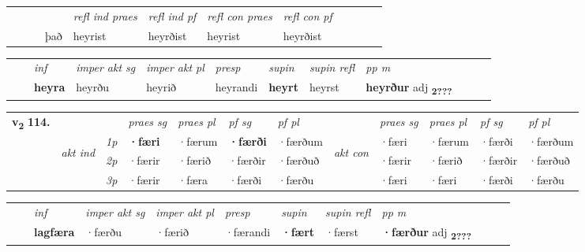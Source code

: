 \begin{tabular}{llllllllllll}
 & &  & &  \textit{refl ind praes} & \textit{refl ind pf} & \textit{refl con praes} & \textit{refl con pf} \\*
 & &  & það & heyrist & heyrðist & heyrist & heyrðist \\*
\cmidrule{5-9}
\end{tabular}


\begin{tabular}{llllllllllll}
 & & \textit{inf} & \textit{imper akt sg} & \textit{imper akt pl}   & \textit{presp} & \textit{supin} & \textit{supin refl} & \textit{pp m}     \\*
  & & \textbf{heyra} & heyrðu  & heyrið   & heyrandi &  \textbf{heyrt} & heyrst & \textbf{heyrður} adj \textbf{\textsubscript{2???}} \\*
\cmidrule{1-12}
\end{tabular}



\begin{tabular}{llllllllllll} \toprule
\multirow{4}{*}{{{\textbf{v{\textsubscript{2}}} \Large{\textbf{114.}}}}}  & &   &  \textit{praes sg}  & \textit{praes pl}  &\textit{ pf sg} & \textit{pf pl} &  &  \textit{praes sg}  & \textit{praes pl}  & \textit{pf sg} & \textit{pf pl } \\*
	\cmidrule{4-7} \cmidrule{9-12}
 & \multirow{3}{*}{\begin{turn}{90}\textit{akt ind}\end{turn}} & {\textit{1p}} & \textbf{·færi} & ·færum    & \textbf{·færði} & ·færðum & \multirow{3}{*}{\begin{turn}{90}\textit{akt con}\end{turn}} &·færi & ·færum & ·færði & ·færðum\\*
& &  {\textit{2p}} &  ·færir  & ·færið   & ·færðir & ·færðuð & & ·færir & ·færið & ·færðir & ·færðuð \\*
& &  {\textit{3p}} & ·færir & ·færa   & ·færði & ·færðu & & ·færi & ·færi& ·færði & ·færðu  \\*
\cmidrule{4-7} \cmidrule{9-12}
\end{tabular}


\begin{tabular}{llllllllllll}
 & & \textit{inf} & \textit{imper akt sg} & \textit{imper akt pl}   & \textit{presp} & \textit{supin} & \textit{supin refl} & \textit{pp m}     \\*
  & & \textbf{lagfæra} & ·færðu  & ·færið   & ·færandi &  \textbf{·fært} & ·færst & \textbf{·færður} adj \textbf{\textsubscript{2???}} \\*
\cmidrule{1-12}
\end{tabular}



